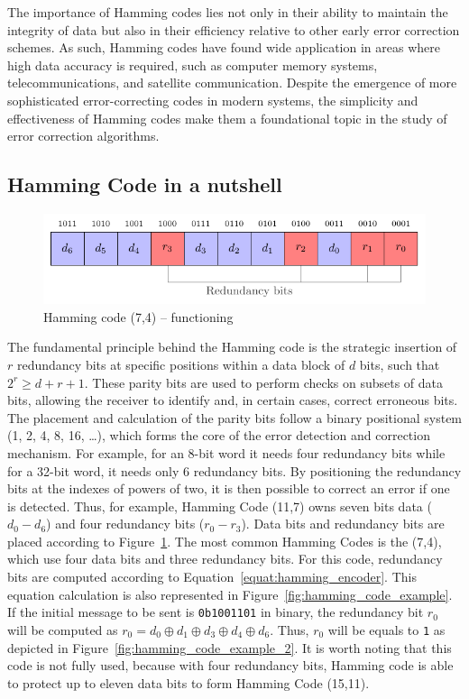 The importance of Hamming codes lies not only in their ability to maintain the integrity of data but also in their efficiency relative to other early error correction schemes. As such, Hamming codes have found wide application in areas where high data accuracy is required, such as computer memory systems, telecommunications, and satellite communication. Despite the emergence of more sophisticated error-correcting codes in modern systems, the simplicity and effectiveness of Hamming codes make them a foundational topic in the study of error correction algorithms.

\subsection{Hamming Code in a nutshell}

\begin{figure}[ht]
    \centering
    \includegraphics[page=1]{c5_countermeasures_dift/img/hamming_bit.pdf}
    \caption{Hamming code (7,4) -- functioning}
    \label{fig:hamming_functionning}
\end{figure}

The fundamental principle behind the Hamming code is the strategic insertion of $r$ redundancy bits at specific positions within a data block of $d$ bits, such that \(2^r \geqslant d + r + 1\).
These parity bits are used to perform checks on subsets of data bits, allowing the receiver to identify and, in certain cases, correct erroneous bits. The placement and calculation of the parity bits follow a binary positional system (1, 2, 4, 8, 16, \ldots), which forms the core of the error detection and correction mechanism. For example, for an 8-bit word it needs four redundancy bits while for a 32-bit word, it needs only 6 redundancy bits. By positioning the redundancy bits at the indexes of powers of two, it is then possible to correct an error if one is detected. Thus, for example, Hamming Code (11,7) owns seven bits data ($d_{0}-d_{6}$) and four redundancy bits ($r_{0}-r_{3}$). Data bits and redundancy bits are placed according to Figure~\ref{fig:hamming_functionning}. The most common Hamming Codes is the (7,4), which use four data bits and three redundancy bits.
For this code, redundancy bits are computed according to Equation~\ref{equat:hamming_encoder}. This equation calculation is also represented in Figure~\ref{fig:hamming_code_example}. If the initial message to be sent is \texttt{0b1001101} in binary, the redundancy bit $r_0$ will be computed as $r_0 = d_{0} \oplus d_{1} \oplus d_{3} \oplus d_{4} \oplus d_{6}$. Thus, $r_0$ will be equals to \texttt{1} as depicted in Figure~\ref{fig:hamming_code_example_2}. It is worth noting that this code is not fully used, because with four redundancy bits, Hamming code is able to protect up to eleven data bits to form Hamming Code (15,11).

